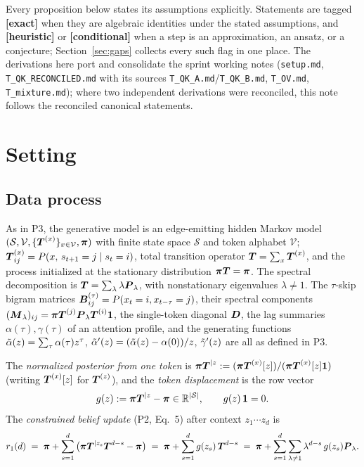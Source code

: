 \documentclass{article}
\begin{document}
Every proposition below states its assumptions explicitly. Statements are tagged \textbf{[exact]} when they are algebraic identities under the stated assumptions, and \textbf{[heuristic]} or \textbf{[conditional]} when a step is an approximation, an ansatz, or a conjecture; Section~\ref{sec:gaps} collects every such flag in one place. The derivations here port and consolidate the sprint working notes (\texttt{setup.md}, \texttt{T\_QK\_RECONCILED.md} with its sources \texttt{T\_QK\_A.md}/\texttt{T\_QK\_B.md}, \texttt{T\_OV.md}, \texttt{T\_mixture.md}); where two independent derivations were reconciled, this note follows the reconciled canonical statements.

\section{Setting}\label{sec:setting}

\subsection{Data process}

As in P3, the generative model is an edge-emitting hidden Markov model $(\mathcal{S}, \mathcal{V}, \{\boldsymbol{T}^{(x)}\}_{x\in\mathcal{V}}, \boldsymbol{\pi})$ with finite state space $\mathcal{S}$ and token alphabet $\mathcal{V}$; $\boldsymbol{T}^{(x)}_{ij} = P(x,\, s_{t+1}=j \mid s_t = i)$, total transition operator $\boldsymbol{T} = \sum_x \boldsymbol{T}^{(x)}$, and the process initialized at the stationary distribution $\boldsymbol{\pi} \boldsymbol{T} = \boldsymbol{\pi}$. The spectral decomposition is $\boldsymbol{T} = \sum_\lambda \lambda \boldsymbol{P}_\lambda$, with nonstationary eigenvalues $\lambda \ne 1$. The $\tau$-skip bigram matrices $\boldsymbol{B}^{(\tau)}_{ij} = P(x_t = i, x_{t-\tau} = j)$, their spectral components $(\boldsymbol{M}_\lambda)_{ij} = \boldsymbol{\pi}\boldsymbol{T}^{(j)}\boldsymbol{P}_\lambda\boldsymbol{T}^{(i)}\boldsymbol{1}$, the single-token diagonal $\boldsymbol{D}$, the lag summaries $\alpha(\tau), \gamma(\tau)$ of an attention profile, and the generating functions $\Tilde{\alpha}(z) = \sum_\tau \alpha(\tau) z^\tau$, $\Tilde{\alpha}'(z) = (\Tilde{\alpha}(z) - \alpha(0))/z$, $\Tilde{\gamma}'(z)$ are all as defined in P3.

The \emph{normalized posterior from one token} is $\boldsymbol{\pi}\boldsymbol{T}^{|z} := (\boldsymbol{\pi}\boldsymbol{T}^{(x)}[z])/(\boldsymbol{\pi}\boldsymbol{T}^{(x)}[z]\boldsymbol{1})$ (writing $\boldsymbol{T}^{(x)}[z]$ for $\boldsymbol{T}^{(z)}$), and the \emph{token displacement} is the row vector
\begin{equation}
    g(z) := \boldsymbol{\pi}\boldsymbol{T}^{|z} - \boldsymbol{\pi} \in \mathbb{R}^{{\vert \mathcal{S}\vert}}, \qquad g(z)\,\boldsymbol{1} = 0 .
\end{equation}
The \emph{constrained belief update} (P2, Eq.~5) after context $z_1 \cdots z_d$ is
\begin{equation}\label{eq:r1}
    r_1(d) \;=\; \boldsymbol{\pi} + \sum_{s=1}^{d}\big(\boldsymbol{\pi}\boldsymbol{T}^{|z_s}\boldsymbol{T}^{d-s} - \boldsymbol{\pi}\big)
    \;=\; \boldsymbol{\pi} + \sum_{s=1}^{d} g(z_s)\,\boldsymbol{T}^{d-s}
    \;=\; \boldsymbol{\pi} + \sum_{s=1}^{d}\sum_{\lambda\ne1}\lambda^{d-s}\, g(z_s)\boldsymbol{P}_\lambda .
\end{equation}
\end{document}
